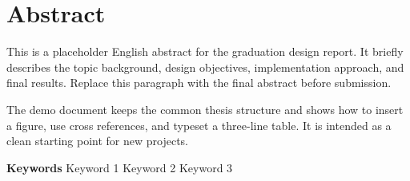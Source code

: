 \chapter{Abstract}

This is a placeholder English abstract for the graduation design report. It briefly describes the topic background, design objectives, implementation approach, and final results. Replace this paragraph with the final abstract before submission.

The demo document keeps the common thesis structure and shows how to insert a figure, use cross references, and typeset a three-line table. It is intended as a clean starting point for new projects.

{
    \vspace{1em}
    \setlength{\parindent}{0em}
    \textbf{Keywords} \; Keyword 1 \; Keyword 2 \; Keyword 3 \par
}
